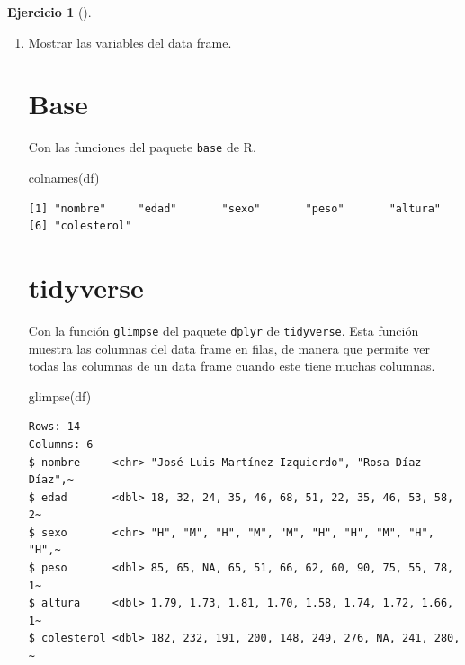 \documentclass[
  spanish,
  a4paper,
]{scrreport}
\newenvironment{Shaded}{\begin{snugshade}}{\end{snugshade}}
\newcommand{\FunctionTok}[1]{\textcolor[rgb]{0.28,0.35,0.67}{#1}}
\newcommand{\NormalTok}[1]{\textcolor[rgb]{0.00,0.23,0.31}{#1}}
\theoremstyle{definition}
\newtheorem{exercise}{Ejercicio}[chapter]
\theoremstyle{remark}
\begin{document}
\begin{exercise}[]
\begin{enumerate}
\begin{tcolorbox}
  \end{tcolorbox}
\item
  Mostrar las variables del data frame.

  \begin{tcolorbox}[enhanced jigsaw, colback=white, coltitle=black, toprule=.15mm, rightrule=.15mm, opacitybacktitle=0.6, opacityback=0, bottomtitle=1mm, toptitle=1mm, titlerule=0mm, breakable, leftrule=.75mm, title=\textcolor{quarto-callout-tip-color}{\faLightbulb}\hspace{0.5em}{Solución}, arc=.35mm, left=2mm, bottomrule=.15mm, colframe=quarto-callout-tip-color-frame, colbacktitle=quarto-callout-tip-color!10!white]

  \section{Base}

  Con las funciones del paquete \texttt{base} de R.

\begin{Shaded}
\begin{Highlighting}[]
\FunctionTok{colnames}\NormalTok{(df)}
\end{Highlighting}
\end{Shaded}

\begin{verbatim}
[1] "nombre"     "edad"       "sexo"       "peso"       "altura"    
[6] "colesterol"
\end{verbatim}

  \section{tidyverse}

  Con la función
  \href{https://dplyr.tidyverse.org/reference/glimpse.html?q=read_csv\#undefined}{\texttt{glimpse}}
  del paquete
  \href{https://dplyr.tidyverse.org/index.html}{\texttt{dplyr}} de
  \texttt{tidyverse}. Esta función muestra las columnas del data frame
  en filas, de manera que permite ver todas las columnas de un data
  frame cuando este tiene muchas columnas.

\begin{Shaded}
\begin{Highlighting}[]
\FunctionTok{glimpse}\NormalTok{(df)}
\end{Highlighting}
\end{Shaded}

\begin{verbatim}
Rows: 14
Columns: 6
$ nombre     <chr> "José Luis Martínez Izquierdo", "Rosa Díaz Díaz",~
$ edad       <dbl> 18, 32, 24, 35, 46, 68, 51, 22, 35, 46, 53, 58, 2~
$ sexo       <chr> "H", "M", "H", "M", "M", "H", "H", "M", "H", "H",~
$ peso       <dbl> 85, 65, NA, 65, 51, 66, 62, 60, 90, 75, 55, 78, 1~
$ altura     <dbl> 1.79, 1.73, 1.81, 1.70, 1.58, 1.74, 1.72, 1.66, 1~
$ colesterol <dbl> 182, 232, 191, 200, 148, 249, 276, NA, 241, 280, ~
\end{verbatim}


\end{tcolorbox}
\end{enumerate}
\end{exercise}
\end{document}
